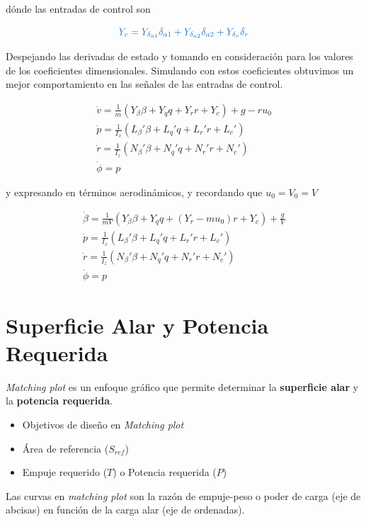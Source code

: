 dónde las entradas de control son

\begin{equation}
    \textcolor{RoyalBlue}{Y_c = Y_{\delta_{a1}} \delta_{a1} + Y_{\delta_{a2}} \delta_{a2} + Y_{\delta_{r}} \delta_{r}}
\end{equation}

Despejando las derivadas de estado y tomando en consideración \cite{Schimdt1998} para los valores de los coeficientes dimensionales. Simulando con estos coeficientes obtuvimos un mejor comportamiento en las señales de las entradas de control. 

\begin{gather}
    \dot v = \frac{1}{m}(Y_\beta \beta + Y_q q + Y_r r + Y_c) + g - r u_0 \\
    \dot p = \frac{1}{I_x}(L_\beta' \beta + L_q' q + L_r' r + L_c') \\
    \dot r = \frac{1}{I_z}(N_\beta' \beta + N_q' q + N_r' r + N_c') \\
    \dot \phi = p
\end{gather}

y expresando en términos aerodinámicos, y recordando que $u_0 = V_0 = V$

\begin{gather}
    \dot \beta = \frac{1}{mV}(Y_\beta \beta + Y_q q + (Y_r - mu_0) r + Y_c) + \frac{g}{V} \\
    \dot p = \frac{1}{I_x}(L_\beta' \beta + L_q' q + L_r' r + L_c') \\
    \dot r = \frac{1}{I_z}(N_\beta' \beta + N_q' q + N_r' r + N_c') \\
    \dot \phi = p
\end{gather}





\section{Superficie Alar y Potencia Requerida}
\label{superficie alar y potencia requerida}

\textit{Matching plot} es un enfoque gráfico que permite determinar la \textbf{superficie alar} y la \textbf{potencia requerida}. 
\begin{itemize}
    \item[] Objetivos de diseño en \textit{Matching plot}
    \item Área de referencia ($S_{ref}$)
    \item Empuje requerido ($T$) o Potencia requerida ($P$)
\end{itemize}
%
Las curvas en \textit{matching plot} son la razón de empuje-peso o poder de carga (eje de abcisas) en función de la carga alar (eje de ordenadas). 

